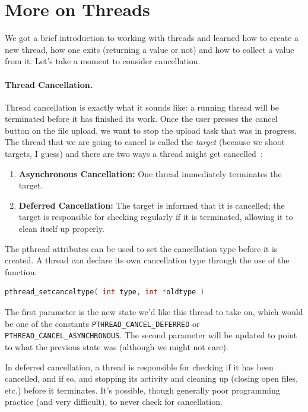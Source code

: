 




\section*{More on Threads}

We got a brief introduction to working with threads and learned how to create a new thread, how one exits (returning a value or not) and how to collect a value from it. Let's take a moment to consider cancellation.

\paragraph{Thread Cancellation.}
Thread cancellation is exactly what it sounds like: a running thread will be terminated before it has finished its work. Once the user presses the cancel button on the file upload, we want to stop the upload task that was in progress. The thread that we are going to cancel is called the \textit{target} (because we shoot targets, I guess) and there are two ways a thread might get cancelled~\cite{osc}:

\begin{enumerate}
	\item \textbf{Asynchronous Cancellation:} One thread immediately terminates the target.
	\item \textbf{Deferred Cancellation:} The target is informed that it is cancelled; the target is responsible for checking regularly if it is terminated, allowing it to clean itself up properly. 
\end{enumerate}

The pthread attributes can be used to set the cancellation type before it is created. A thread can declare its own cancellation type through the use of the function:
\begin{lstlisting}[language=C]
pthread_setcanceltype( int type, int *oldtype )
\end{lstlisting}

The first parameter is the new state we'd like this thread to take on, which would be one of the constants \texttt{PTHREAD\_CANCEL\_DEFERRED} or \texttt{PTHREAD\_CANCEL\_ASYNCHRONOUS}. The second parameter will be updated to point to what the previous state was (although we might not care).

In deferred cancellation, a thread is responsible for checking if it has been cancelled, and if so, and stopping its activity and cleaning up (closing open files, etc.) before it terminates. It's possible, though generally poor programming practice (and very difficult), to never check for cancellation.

